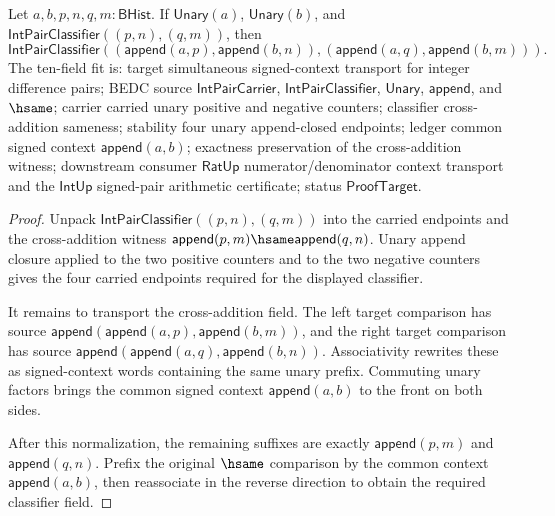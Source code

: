 \begin{theorem}
\label{thm:int-pair-classifier-signed-context-invariance}
Let $a,b,p,n,q,m:\mathsf{BHist}$. If $\mathsf{Unary}(a)$,
$\mathsf{Unary}(b)$, and
$\mathsf{IntPairClassifier}((p,n),(q,m))$, then
$$
\mathsf{IntPairClassifier}
((\mathsf{append}(a,p),\mathsf{append}(b,n)),
(\mathsf{append}(a,q),\mathsf{append}(b,m))).
$$
The ten-field fit is: target simultaneous signed-context transport for
integer difference pairs; BEDC source $\mathsf{IntPairCarrier}$,
$\mathsf{IntPairClassifier}$, $\mathsf{Unary}$, $\mathsf{append}$, and
$\hsame$; carrier carried unary positive and negative counters; classifier
cross-addition sameness; stability four unary append-closed endpoints;
ledger common signed context $\mathsf{append}(a,b)$; exactness preservation of
the cross-addition witness; downstream consumer $\mathsf{RatUp}$
numerator/denominator context transport and the $\mathsf{IntUp}$ signed-pair
arithmetic certificate; status $\mathsf{ProofTarget}$.
\end{theorem}
\begin{proof}
Unpack $\mathsf{IntPairClassifier}((p,n),(q,m))$ into the carried endpoints
and the cross-addition witness
$\mathsf{append}(p,m)\hsame\mathsf{append}(q,n)$. Unary append closure applied
to the two positive counters and to the two negative counters gives the four
carried endpoints required for the displayed classifier.

It remains to transport the cross-addition field. The left target comparison
has source
$\mathsf{append}(\mathsf{append}(a,p),\mathsf{append}(b,m))$, and the right
target comparison has source
$\mathsf{append}(\mathsf{append}(a,q),\mathsf{append}(b,n))$.
Associativity rewrites these as signed-context words containing the same
unary prefix. Commuting unary factors brings the common signed context
$\mathsf{append}(a,b)$ to the front on both sides.

After this normalization, the remaining suffixes are exactly
$\mathsf{append}(p,m)$ and $\mathsf{append}(q,n)$. Prefix the original
$\hsame$ comparison by the common context $\mathsf{append}(a,b)$, then
reassociate in the reverse direction to obtain the required classifier field.
\end{proof}

